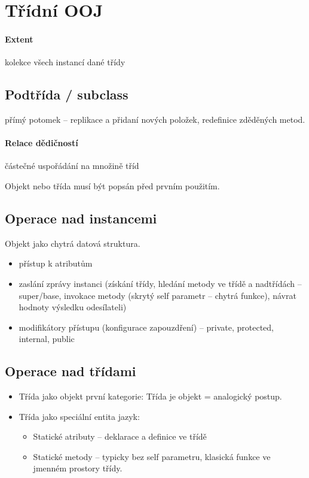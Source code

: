 \documentclass[a4wide]{report}
\begin{document}
\section{Třídní OOJ}

\paragraph{Extent} kolekce všech instancí dané třídy

\subsection{Podtřída / subclass} přímý potomek -- replikace a přidaní nových položek, redefinice zděděných metod.

\paragraph{Relace dědičností} částečné uspořádání na množině tříd

Objekt nebo třída musí být popsán před prvním použitím. 

\subsection{Operace nad instancemi}
Objekt jako chytrá datová struktura.
\begin{itemize}
	\item přístup k atributům
	\item zaslání zprávy instanci (získání třídy, hledání metody ve třídě a nadtřídách -- super/base, invokace metody (skrytý self parametr -- chytrá funkce), návrat hodnoty výsledku odesílateli)
	\item modifikátory přístupu (konfigurace zapouzdření) -- private, protected, internal, public
\end{itemize}

\subsection{Operace nad třídami}
\begin{itemize}
	\item Třída jako objekt první kategorie: Třída je objekt = analogický postup.
	\item Třída jako speciální entita jazyk:
	\begin{itemize}
		\item Statické atributy -- deklarace a definice ve třídě
		\item Statické metody -- typicky bez self parametru, klasická funkce ve jmenném prostory třídy.
	\end{itemize}
\end{itemize}
\end{document}
